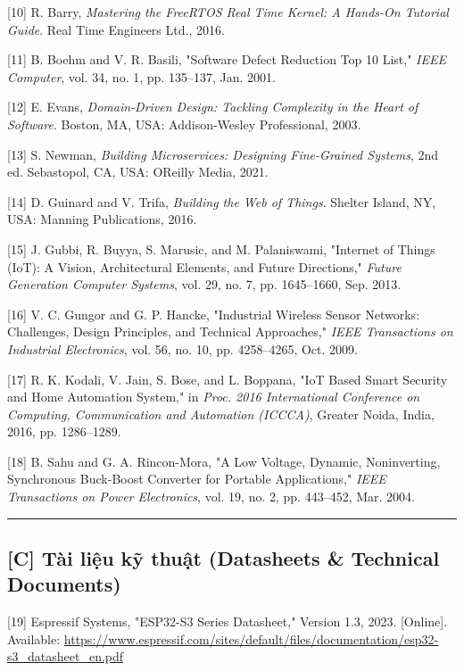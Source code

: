 \documentclass[a4paper]{extarticle}
\begin{document}
{[}10{]} R. Barry, \emph{Mastering the FreeRTOS Real Time Kernel: A
Hands-On Tutorial Guide}. Real Time Engineers Ltd., 2016.

{[}11{]} B. Boehm and V. R. Basili, "Software Defect Reduction Top 10
List," \emph{IEEE Computer}, vol. 34, no. 1, pp. 135--137, Jan. 2001.

{[}12{]} E. Evans, \emph{Domain-Driven Design: Tackling Complexity in
the Heart of Software}. Boston, MA, USA: Addison-Wesley Professional,
2003.

{[}13{]} S. Newman, \emph{Building Microservices: Designing Fine-Grained
Systems}, 2nd ed. Sebastopol, CA, USA: O\textquotesingle Reilly Media,
2021.

{[}14{]} D. Guinard and V. Trifa, \emph{Building the Web of Things}.
Shelter Island, NY, USA: Manning Publications, 2016.

{[}15{]} J. Gubbi, R. Buyya, S. Marusic, and M. Palaniswami, "Internet
of Things (IoT): A Vision, Architectural Elements, and Future
Directions," \emph{Future Generation Computer Systems}, vol. 29, no. 7,
pp. 1645--1660, Sep. 2013.

{[}16{]} V. C. Gungor and G. P. Hancke, "Industrial Wireless Sensor
Networks: Challenges, Design Principles, and Technical Approaches,"
\emph{IEEE Transactions on Industrial Electronics}, vol. 56, no. 10, pp.
4258--4265, Oct. 2009.

{[}17{]} R. K. Kodali, V. Jain, S. Bose, and L. Boppana, "IoT Based
Smart Security and Home Automation System," in \emph{Proc. 2016
International Conference on Computing, Communication and Automation
(ICCCA)}, Greater Noida, India, 2016, pp. 1286--1289.

{[}18{]} B. Sahu and G. A. Rincon-Mora, "A Low Voltage, Dynamic,
Noninverting, Synchronous Buck-Boost Converter for Portable
Applications," \emph{IEEE Transactions on Power Electronics}, vol. 19,
no. 2, pp. 443--452, Mar. 2004.

\begin{center}\rule{0.5\linewidth}{0.5pt}\end{center}

\subsection{{[}C{]} Tài liệu kỹ thuật (Datasheets \& Technical
Documents)}\label{c-tuxe0i-liux1ec7u-kux1ef9-thuux1eadt-datasheets--technical-documents}

{[}19{]} Espressif Systems, "ESP32-S3 Series Datasheet," Version 1.3,
2023. {[}Online{]}. Available:
\url{https://www.espressif.com/sites/default/files/documentation/esp32-s3_datasheet_en.pdf}
\end{document}
